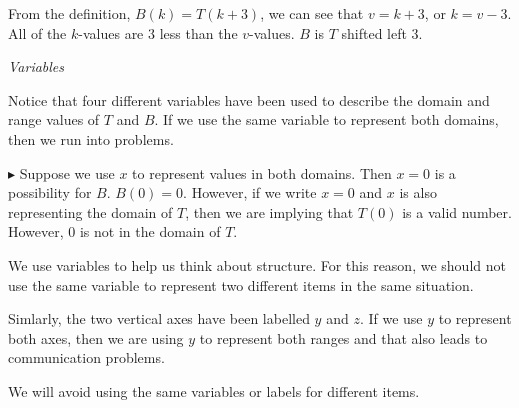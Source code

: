 \documentclass{ximera}
\begin{document}
From the definition, $B(k) = T(k+3)$, we can see that $v=k+3$, or $k=v-3$.  All of the $k$-values are $3$ less than the $v$-values.  $B$ is $T$ shifted left $3$.





\begin{warning} \textit{Variables}

Notice that four different variables have been used to describe the domain and range values of $T$ and $B$.  If we use the same variable to represent both domains, then we run into problems.


$\blacktriangleright$ Suppose we use $x$ to represent values in both domains.  Then $x = 0$ is a possibility for $B$.  $B(0) = 0$.  However, if we write $x = 0$ and $x$ is also representing the domain of $T$, then we are implying that $T(0)$ is a valid number.  However, $0$ is not in the domain of $T$.

We use variables to help us think about structure.  For this reason, we should not use the same variable to represent two different items in the same situation.


Simlarly, the two vertical axes have been labelled $y$ and $z$.  If we use $y$ to represent both axes, then we are using $y$ to represent both ranges and that also leads to communication problems.

We will avoid using the same variables or labels for different items.

\end{warning}
\end{document}
